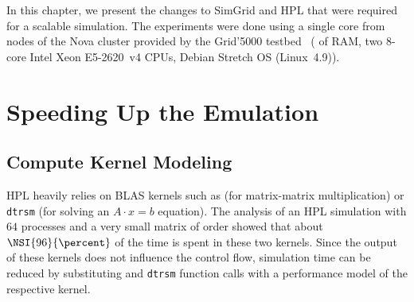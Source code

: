     In this chapter, we present the changes to SimGrid and HPL that were required for a scalable simulation.  The
    experiments were done using a single core from nodes of the Nova cluster provided by the Grid'5000
    testbed~\cite{grid5000} ( of RAM, two 8-core Intel Xeon E5-2620 v4 CPUs, Debian Stretch OS
    (Linux 4.9)).


    \section{Speeding Up the Emulation}
    \label{sec:speeding_emulation}

        \subsection{Compute Kernel Modeling}
            HPL heavily relies on BLAS kernels such as \dgemm (for matrix-matrix multiplication) or \texttt{dtrsm} (for
            solving an  \(A\cdot x=b\) equation). The analysis of an HPL simulation with \(64\) processes and a very
            small matrix of order  showed that about \(\NSI{96}{\percent}\) of the time is spent in these two
            kernels. Since the output of these kernels does not influence the control flow, simulation time can be
            reduced by substituting \dgemm and \texttt{dtrsm} function calls with a performance model of the respective
            kernel.

